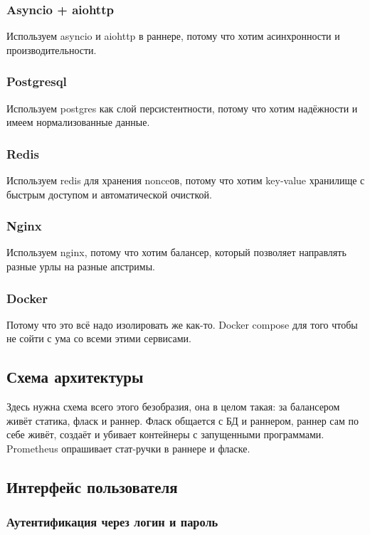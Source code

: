 \documentclass[a4paper,article,14pt]{extarticle}
\begin{document}
\subsubsection{Asyncio + aiohttp}
Используем asyncio и aiohttp в раннере, потому что хотим асинхронности и производительности.

\subsubsection{Postgresql}
Используем postgres как слой персистентности, потому что хотим надёжности и имеем нормализованные данные.

\subsubsection{Redis}
Используем redis для хранения nonceов, потому что хотим key-value хранилище с быстрым доступом и автоматической очисткой.

\subsubsection{Nginx}
Используем nginx, потому что хотим балансер, который позволяет направлять разные урлы на разные апстримы.

\subsubsection{Docker}
Потому что это всё надо изолировать же как-то. Docker compose для того чтобы не сойти с ума со всеми этими сервисами.

\subsection{Схема архитектуры}

Здесь нужна схема всего этого безобразия, она в целом такая: за балансером живёт статика, фласк и раннер. Фласк общается с БД и раннером, раннер сам по себе живёт, создаёт и убивает контейнеры с запущенными программами. Prometheus опрашивает стат-ручки в раннере и фласке.

\subsection{Интерфейс пользователя}

\subsubsection{Аутентификация через логин и пароль}
\end{document}
